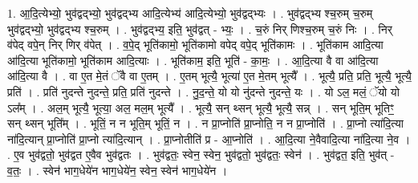 \documentclass[17pt]{extarticle}
\begin{document}
1. आ॒दि॒त्येभ्यो॒ भुव॑द्वद्भ्यो॒ भुव॑द्वद्भ्य आदि॒त्येभ्य॑ आदि॒त्येभ्यो॒ भुव॑द्वद्भ्यः । . भुव॑द्वद्भ्य श्च॒रुम् च॒रुम् भुव॑द्वद्भ्यो॒ भुव॑द्वद्भ्य श्च॒रुम् । . भुव॑द्वद्भ्य॒ इति॒ भुव॑द्वत् - भ्यः॒ । . च॒रुं निर् णिश्च॒रुम् च॒रुं निः । . निर् व॑पेद् वपे॒न् निर् णिर् व॑पेत् । . व॒पे॒द् भूति॑कामो॒ भूति॑कामो वपेद् वपे॒द् भूति॑कामः । . भूति॑काम आदि॒त्या आ॑दि॒त्या भूति॑कामो॒ भूति॑काम आदि॒त्याः । . भूति॑काम॒ इति॒ भूति॑ - का॒मः॒ । . आ॒दि॒त्या वै वा आ॑दि॒त्या आ॑दि॒त्या वै । . वा ए॒त मे॒तं ॅवै वा ए॒तम् । . ए॒तम् भूत्यै॒ भूत्या॑ ए॒त मे॒तम् भूत्यै᳚ । . भूत्यै॒ प्रति॒ प्रति॒ भूत्यै॒ भूत्यै॒ प्रति॑ । . प्रति॑ नुदन्ते नुदन्ते॒ प्रति॒ प्रति॑ नुदन्ते । . नु॒द॒न्ते॒ यो यो नु॑दन्ते नुदन्ते॒ यः । . यो ऽल॒ मलं॒ ॅयो यो ऽल᳚म् । . अल॒म् भूत्यै॒ भूत्या॒ अल॒ मल॒म् भूत्यै᳚ । . भूत्यै॒ सन् थ्सन् भूत्यै॒ भूत्यै॒ सन्न् । . सन् भूति॒म् भूतिꣳ॒॒ सन् थ्सन् भूति᳚म् । . भूतिं॒ न न भूति॒म् भूतिं॒ न । . न प्रा॒प्नोति॑ प्रा॒प्नोति॒ न न प्रा॒प्नोति॑ । . प्रा॒प्नो त्या॑दि॒त्या ना॑दि॒त्यान् प्रा॒प्नोति॑ प्रा॒प्नो त्या॑दि॒त्यान् । . प्रा॒प्नोतीति॑ प्र - आ॒प्नोति॑ । . आ॒दि॒त्या ने॒वैवादि॒त्या ना॑दि॒त्या ने॒व । . ए॒व भुव॑द्वतो॒ भुव॑द्वत ए॒वैव भुव॑द्वतः । . भुव॑द्वतः॒ स्वेन॒ स्वेन॒ भुव॑द्वतो॒ भुव॑द्वतः॒ स्वेन॑ । . भुव॑द्वत॒ इति॒ भुव॑त् - व॒तः॒ । . स्वेन॑ भाग॒धेये॑न भाग॒धेये॑न॒ स्वेन॒ स्वेन॑ भाग॒धेये॑न । \newline
\end{document}
